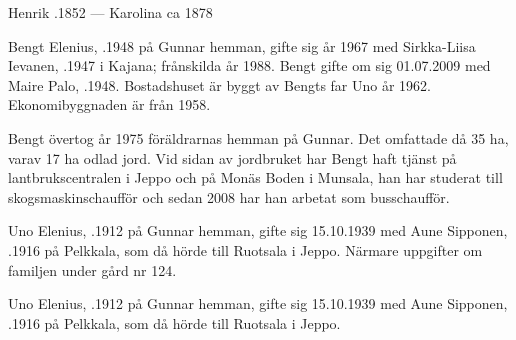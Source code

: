 Henrik .1852  ---  Karolina \textdied ca 1878






Bengt Elenius, .1948 på Gunnar hemman, gifte sig år 1967 med Sirkka-Liisa Ievanen, .1947 i Kajana; frånskilda år 1988. Bengt gifte om sig 01.07.2009 med Maire Palo, .1948. Bostadshuset är byggt av Bengts far Uno år 1962. Ekonomibyggnaden är från 1958.
\begin{jhchildren}
  \item {}
  \item {}
  \item {}
\end{jhchildren}

Bengt övertog år 1975 föräldrarnas hemman på Gunnar. Det omfattade då 35 ha, varav 17 ha odlad jord. Vid sidan av jordbruket har Bengt haft tjänst på lantbrukscentralen i Jeppo och på Monäs Boden i Munsala, han har studerat till skogsmaskinschaufför och sedan 2008 har han arbetat som busschaufför.


Uno Elenius, .1912 på Gunnar hemman, gifte sig 15.10.1939 med Aune Sipponen, .1916 på Pelkkala, som då hörde till Ruotsala i Jeppo. Närmare uppgifter om familjen under gård nr 124.




Uno Elenius, .1912 på Gunnar hemman, gifte sig 15.10.1939 med Aune Sipponen, .1916 på Pelkkala, som då hörde till Ruotsala i Jeppo.
\begin{jhchildren}
  \item {}
  \item {}
  \item {}
  \item {}
\end{jhchildren}

